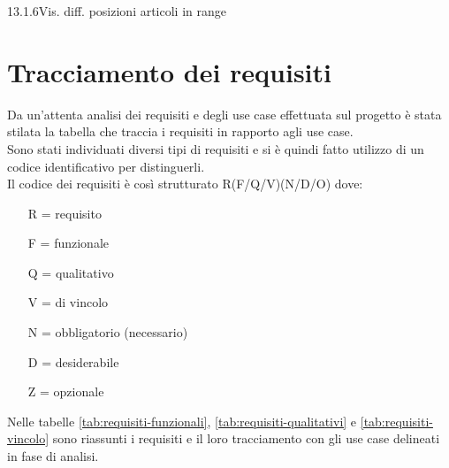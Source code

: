 \begin{usecase}{13.1.6}{Vis. diff. posizioni articoli in range}
    \label{uc:scenario-principale}
\end{usecase}




\section{Tracciamento dei requisiti}

Da un'attenta analisi dei requisiti e degli use case effettuata sul progetto è stata stilata la tabella che traccia i requisiti in rapporto agli use case.\\
Sono stati individuati diversi tipi di requisiti e si è quindi fatto utilizzo di un codice identificativo per distinguerli.\\
Il codice dei requisiti è così strutturato R(F/Q/V)(N/D/O) dove:
\begin{enumerate}
	\item[R =] requisito
    \item[F =] funzionale
    \item[Q =] qualitativo
    \item[V =] di vincolo
    \item[N =] obbligatorio (necessario)
    \item[D =] desiderabile
    \item[Z =] opzionale
\end{enumerate}
Nelle tabelle \ref{tab:requisiti-funzionali}, \ref{tab:requisiti-qualitativi} e \ref{tab:requisiti-vincolo} sono riassunti i requisiti e il loro tracciamento con gli use case delineati in fase di analisi.

\newpage

